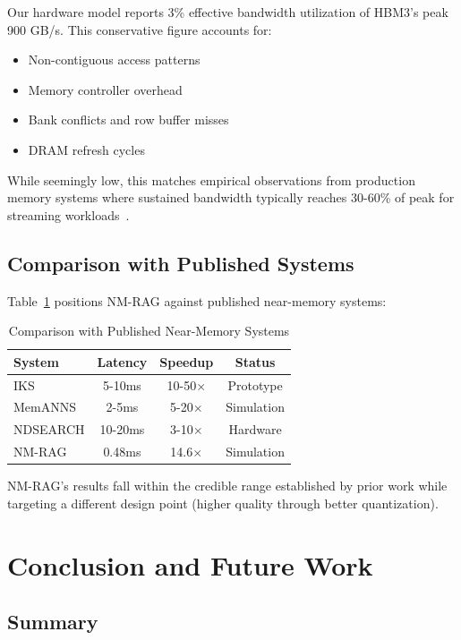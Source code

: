 \documentclass[conference]{IEEEtran}
\begin{document}
Our hardware model reports 3\% effective bandwidth utilization of HBM3's peak 900 GB/s. This conservative figure accounts for:
\begin{itemize}
    \item Non-contiguous access patterns
    \item Memory controller overhead
    \item Bank conflicts and row buffer misses
    \item DRAM refresh cycles
\end{itemize}

While seemingly low, this matches empirical observations from production memory systems where sustained bandwidth typically reaches 30-60\% of peak for streaming workloads~\cite{mccalpin2007stream}.

\subsection{Comparison with Published Systems}

Table~\ref{tab:comparison} positions NM-RAG against published near-memory systems:

\begin{table}[H]
\centering
\caption{Comparison with Published Near-Memory Systems}
\label{tab:comparison}
\begin{tabular}{lccc}
\toprule
\textbf{System} & \textbf{Latency} & \textbf{Speedup} & \textbf{Status} \\
\midrule
IKS & 5-10ms & 10-50$\times$ & Prototype \\
MemANNS & 2-5ms & 5-20$\times$ & Simulation \\
NDSEARCH & 10-20ms & 3-10$\times$ & Hardware \\
NM-RAG & 0.48ms & 14.6$\times$ & Simulation \\
\bottomrule
\end{tabular}
\end{table}

NM-RAG's results fall within the credible range established by prior work while targeting a different design point (higher quality through better quantization).

\section{Conclusion and Future Work}

\subsection{Summary}
\end{document}
